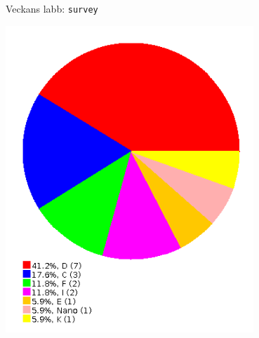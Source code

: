 \begin{Slide}{Veckans labb: \texttt{survey}}
\begin{minipage}{0.25\textwidth}
\vspace{2em}\includegraphics[width=0.7\textwidth]{../img/survey/pie}
\end{minipage}
\end{Slide}
